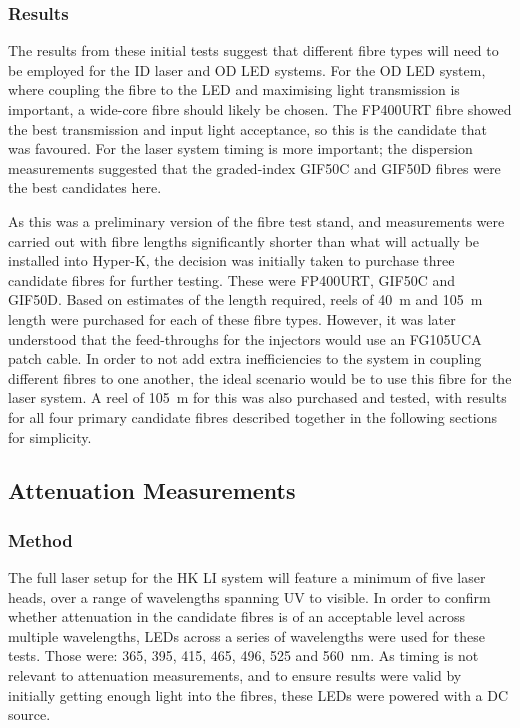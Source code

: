 \documentclass[a4paper,11pt]{article}
\begin{document}
\subsubsection{Results}

The results from these initial tests suggest that different fibre types will need to be employed for the ID laser and OD LED systems. For the OD LED system, where coupling the fibre to the LED and maximising light transmission is important, a wide-core fibre should likely be chosen. The FP400URT fibre showed the best transmission and input light acceptance, so this is the candidate that was favoured. For the laser system timing is more important; the dispersion measurements suggested that the graded-index GIF50C and GIF50D fibres were the best candidates here.

As this was a preliminary version of the fibre test stand, and measurements were carried out with fibre lengths significantly shorter than what will actually be installed into Hyper-K, the decision was initially taken to purchase three candidate fibres for further testing. These were FP400URT, GIF50C and GIF50D. Based on estimates of the length required, reels of 40~m and 105~m length were purchased for each of these fibre types. However, it was later understood that the feed-throughs for the injectors would use an FG105UCA patch cable. In order to not add extra inefficiencies to the system in coupling different fibres to one another, the ideal scenario would be to use this fibre for the laser system. A reel of 105~m for this was also purchased and tested, with results for all four primary candidate fibres described together in the following sections for simplicity.


\subsection{Attenuation Measurements}\label{sec:atten}

\subsubsection{Method}\label{sec:fibre:sub:att:sub:method}

The full laser setup for the HK LI system will feature a minimum of five laser heads, over a range of wavelengths spanning UV to visible. In order to confirm whether attenuation in the candidate fibres is of an acceptable level across multiple wavelengths, LEDs across a series of wavelengths were used for these tests. Those were: 365, 395, 415, 465, 496, 525 and 560~nm. As timing is not relevant to attenuation measurements, and to ensure results were valid by initially getting enough light into the fibres, these LEDs were powered with a DC source.
\end{document}
